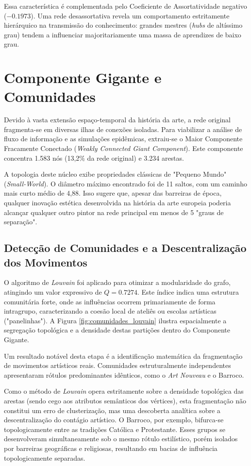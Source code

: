 \documentclass[12pt,a4paper]{article}
\begin{document}
Essa característica é complementada pelo Coeficiente de Assortatividade negativo ($-0.1973$). Uma rede desassortativa revela um comportamento estritamente hierárquico na transmissão do conhecimento: grandes mestres (\textit{hubs} de altíssimo grau) tendem a influenciar majoritariamente uma massa de aprendizes de baixo grau.

\section{Componente Gigante e Comunidades}

Devido à vasta extensão espaço-temporal da história da arte, a rede original fragmenta-se em diversas ilhas de conexões isoladas. Para viabilizar a análise de fluxo de informação e as simulações epidêmicas, extraiu-se o Maior Componente Fracamente Conectado (\textit{Weakly Connected Giant Component}). Este componente concentra 1.583 nós (13,2\% da rede original) e 3.234 arestas.

A topologia deste núcleo exibe propriedades clássicas de "Pequeno Mundo" (\textit{Small-World}). O diâmetro máximo encontrado foi de 11 saltos, com um caminho mais curto médio de 4,88. Isso sugere que, apesar das barreiras de época, qualquer inovação estética desenvolvida na história da arte europeia poderia alcançar qualquer outro pintor na rede principal em menos de 5 "graus de separação".

\subsection{Detecção de Comunidades e a Descentralização dos Movimentos}

O algoritmo de \textit{Louvain} foi aplicado para otimizar a modularidade do grafo, atingindo um valor expressivo de $Q = 0.7274$. Este índice indica uma estrutura comunitária forte, onde as influências ocorrem primariamente de forma intragrupo, caracterizando a coesão local de ateliês ou escolas artísticas ("panelinhas"). A Figura \ref{fig:comunidades_louvain} ilustra espacialmente a segregação topológica e a densidade destas partições dentro do Componente Gigante.

Um resultado notável desta etapa é a identificação matemática da fragmentação de movimentos artísticos reais. Comunidades estruturalmente independentes apresentaram rótulos predominantes idênticos, como o \textit{Art Nouveau} e o Barroco.

Como o método de \textit{Louvain} opera estritamente sobre a densidade topológica das arestas (sendo cego aos atributos semânticos dos vértices), esta fragmentação não constitui um erro de clusterização, mas uma descoberta analítica sobre a descentralização do contágio artístico. O Barroco, por exemplo, bifurca-se topologicamente entre as tradições Católica e Protestante. Esses grupos se desenvolveram simultaneamente sob o mesmo rótulo estilístico, porém isolados por barreiras geográficas e religiosas, resultando em bacias de influência topologicamente separadas.
\end{document}
